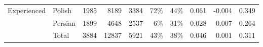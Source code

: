 \begin{table}
\begin{tabular}{llrrrr|rrrr}
\cline{1-10}
\multirow{3}{*}{Experienced} & Polish &                  1985 &                       8189 &                  3384 &                    72\% &                                                44\% &                 0.061 &                          -0.004 &       0.349 \\
            & Persian &                  1899 &                       4648 &                  2537 &                     6\% &                                                31\% &                 0.028 &                           0.007 &       0.264 \\
            & Total &                  3884 &                      12837 &                  5921 &                    43\% &                                                38\% &                 0.046 &                           0.001 &       0.311 \\
\bottomrule

\end{tabular}
\label{table:participants}
\end{table}
